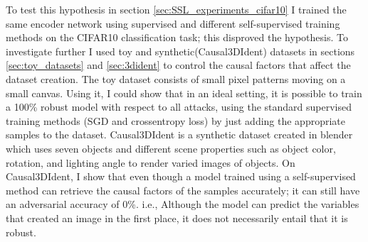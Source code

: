 \documentclass[../thesis.tex]{subfiles}
\begin{document}
	To test this hypothesis in section \ref{sec:SSL_experiments_cifar10} I trained the same encoder network using supervised and different self-supervised training methods on the CIFAR10 classification task; this disproved the hypothesis. To investigate further I used toy and synthetic(Causal3DIdent) datasets in sections \ref{sec:toy_datasets} and \ref{sec:3dident} to control the causal factors that affect the dataset creation. The toy dataset consists of small pixel patterns moving on a small canvas. Using it, I could show that in an ideal setting, it is possible to train a 100\% robust model with respect to all attacks, using the standard supervised training methods (SGD and crossentropy loss) by just adding the appropriate samples to the dataset. Causal3DIdent is a synthetic dataset created in blender which uses seven objects and different scene properties such as object color, rotation, and lighting angle to render varied images of objects. On Causal3DIdent, I show that even though a model trained using a self-supervised method can retrieve the causal factors of the samples accurately; it can still have an adversarial accuracy of 0\%. i.e., Although the model can predict the variables that created an image in the first place, it does not necessarily entail that it is robust.
\end{document}

